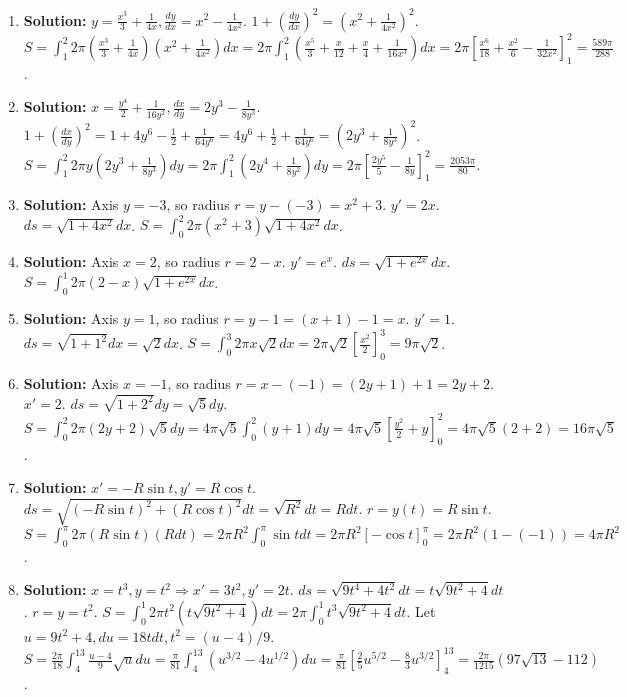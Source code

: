 \documentclass{article}
\begin{document}
\begin{enumerate}
\item \textbf{Solution:} $y=\frac{x^3}{3}+\frac{1}{4x}, \frac{dy}{dx}=x^2-\frac{1}{4x^2}$. $1+(\frac{dy}{dx})^2 = (x^2+\frac{1}{4x^2})^2$.
$S=\int_1^2 2\pi(\frac{x^3}{3}+\frac{1}{4x})(x^2+\frac{1}{4x^2})dx=2\pi\int_1^2(\frac{x^5}{3}+\frac{x}{12}+\frac{x}{4}+\frac{1}{16x^3})dx=2\pi[\frac{x^6}{18}+\frac{x^2}{6}-\frac{1}{32x^2}]_1^2 = \frac{589\pi}{288}$.

\item \textbf{Solution:} $x=\frac{y^4}{2}+\frac{1}{16y^2}, \frac{dx}{dy}=2y^3-\frac{1}{8y^3}$. $1+(\frac{dx}{dy})^2=1+4y^6-\frac{1}{2}+\frac{1}{64y^6}=4y^6+\frac{1}{2}+\frac{1}{64y^6}=(2y^3+\frac{1}{8y^3})^2$.
$S=\int_1^2 2\pi y(2y^3+\frac{1}{8y^3})dy=2\pi\int_1^2(2y^4+\frac{1}{8y^2})dy=2\pi[\frac{2y^5}{5}-\frac{1}{8y}]_1^2 = \frac{2053\pi}{80}$.

\item \textbf{Solution:} Axis $y=-3$, so radius $r=y-(-3)=x^2+3$. $y'=2x$. $ds=\sqrt{1+4x^2}dx$.
$S=\int_0^2 2\pi(x^2+3)\sqrt{1+4x^2}dx$.

\item \textbf{Solution:} Axis $x=2$, so radius $r=2-x$. $y'=e^x$. $ds=\sqrt{1+e^{2x}}dx$.
$S=\int_0^1 2\pi(2-x)\sqrt{1+e^{2x}}dx$.

\item \textbf{Solution:} Axis $y=1$, so radius $r=y-1=(x+1)-1=x$. $y'=1$. $ds=\sqrt{1+1^2}dx=\sqrt{2}dx$.
$S=\int_0^3 2\pi x \sqrt{2} dx = 2\pi\sqrt{2}[\frac{x^2}{2}]_0^3 = 9\pi\sqrt{2}$.

\item \textbf{Solution:} Axis $x=-1$, so radius $r=x-(-1)=(2y+1)+1=2y+2$. $x'=2$. $ds=\sqrt{1+2^2}dy=\sqrt{5}dy$.
$S=\int_0^2 2\pi(2y+2)\sqrt{5}dy = 4\pi\sqrt{5}\int_0^2(y+1)dy = 4\pi\sqrt{5}[\frac{y^2}{2}+y]_0^2 = 4\pi\sqrt{5}(2+2)=16\pi\sqrt{5}$.

\item \textbf{Solution:} $x'= -R\sin t, y'=R\cos t$. $ds=\sqrt{(-R\sin t)^2+(R\cos t)^2}dt = \sqrt{R^2}dt=Rdt$. $r=y(t)=R\sin t$.
$S=\int_0^\pi 2\pi (R\sin t) (R dt) = 2\pi R^2 \int_0^\pi \sin t dt = 2\pi R^2[-\cos t]_0^\pi = 2\pi R^2(1-(-1))=4\pi R^2$.

\item \textbf{Solution:} $x=t^3, y=t^2 \Rightarrow x'=3t^2, y'=2t$. $ds=\sqrt{9t^4+4t^2}dt = t\sqrt{9t^2+4}dt$. $r=y=t^2$.
$S=\int_0^1 2\pi t^2 (t\sqrt{9t^2+4})dt = 2\pi\int_0^1 t^3\sqrt{9t^2+4}dt$.
Let $u=9t^2+4, du=18tdt, t^2=(u-4)/9$. $S=\frac{2\pi}{18}\int_4^{13}\frac{u-4}{9} \sqrt{u} du = \frac{\pi}{81}\int_4^{13}(u^{3/2}-4u^{1/2})du = \frac{\pi}{81}[\frac{2}{5}u^{5/2}-\frac{8}{3}u^{3/2}]_4^{13} = \frac{2\pi}{1215}(97\sqrt{13}-112)$.


\end{enumerate}
\end{document}
